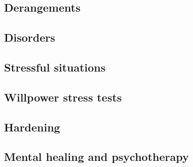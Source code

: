 \subsection{Derangements}

\subsection{Disorders}

\subsection{Stressful situations}

\subsection{Willpower stress tests}

\subsection{Hardening}

\subsection{Mental healing and psychotherapy}


